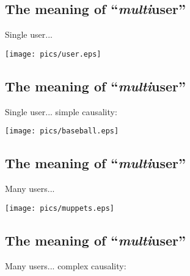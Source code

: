 \documentclass[xga]{xdvislides}
\begin{document}
%
%
%

\subsection{The meaning of ``{\em multi}user''}
Single user... \\

\begin{center}
	\texttt{[image: pics/user.eps]}
\end{center}

\subsection{The meaning of ``{\em multi}user''}
Single user... simple causality: \\

\begin{center}
	\texttt{[image: pics/baseball.eps]}
\end{center}

\subsection{The meaning of ``{\em multi}user''}
Many users...

\begin{center}
	\texttt{[image: pics/muppets.eps]}
\end{center}


\subsection{The meaning of ``{\em multi}user''}
Many users... complex causality:
\end{document}
